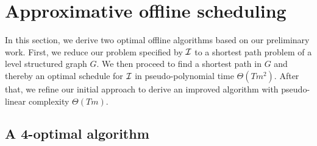 
\chapter{Approximative offline scheduling}
In this section, we derive two optimal offline algorithms based on our preliminary work.
First, we reduce our problem specified by $\mathcal{I}$ to a shortest path problem of a level structured graph $G$. We then proceed to find a shortest path in $G$ and thereby an optimal schedule for $\mathcal{I}$ in pseudo-polynomial time $\Theta(Tm^2)$.
After that, we refine our initial approach to derive an improved algorithm with pseudo-linear complexity $\Theta(Tm)$.

\section{A 4-optimal algorithm}
